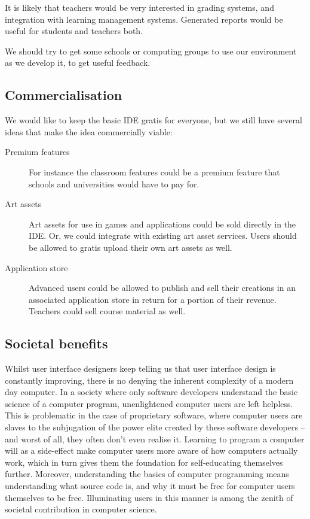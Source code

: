 It is likely that teachers would be very interested in grading systems, and 
integration with learning management systems. Generated reports would be 
useful for students and teachers both.

We should try to get some schools or computing groups to use our environment 
as we develop it, to get useful feedback.

\subsection{Commercialisation}

We would like to keep the basic IDE gratis for everyone, but we still have
several ideas that make the idea commercially viable:

\begin{description}
  \item[Premium features]
    For instance the classroom features could be a premium feature that schools
    and universities would have to pay for.
  \item[Art assets]
    Art assets for use in games and applications could be sold directly in the
    IDE. Or, we could integrate with existing art asset services. Users should 
    be allowed to gratis upload their own art assets as well.
  \item[Application store]
    Advanced users could be allowed to publish and sell their creations in an 
    associated application store in return for a portion of their revenue. 
    Teachers could sell course material as well.
\end{description}

\subsection{Societal benefits}
Whilst user interface designers keep telling us that user interface design is 
constantly improving, there is no denying the inherent complexity of a modern 
day computer. In a society where only software developers understand the basic 
science of a computer program, unenlightened computer users are left helpless. 
This is problematic in the case of proprietary software, where computer users 
are slaves to the subjugation of the power elite created by these software 
developers -- and worst of all, they often don't even realise it. Learning to 
program a computer will as a side-effect make computer users more aware of how 
computers actually work, which in turn gives them the foundation for 
self-educating themselves further. Moreover, understanding the basics of 
computer programming means understanding what source code is, and why it must 
be free for computer users themselves to be free. Illuminating users in this 
manner is among the zenith of societal contribution in computer science.

